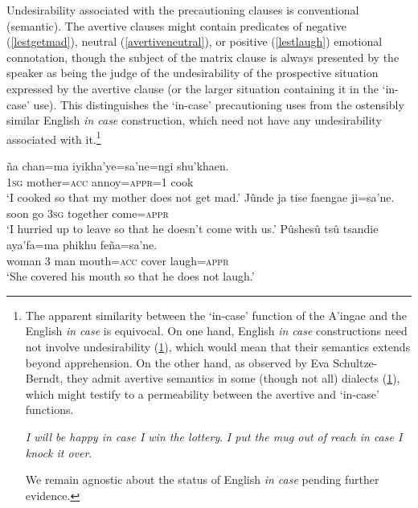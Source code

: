 \documentclass[output=paper,colorlinks,citecolor=brown]{langscibook}
\begin{document}
Undesirability associated with the precautioning  clauses is conventional (semantic). The avertive  clauses might contain predicates of negative (\ref{lestgetmad}), neutral (\ref{avertiveneutral}), or positive (\ref{lestlaugh}) emotional connotation, though the subject of the matrix clause is always presented by the speaker as being the judge of the undesirability of the prospective situation expressed by the avertive  clause (or the larger situation containing it in the `in-case' use). This distinguishes the `in-case' precautioning uses from the ostensibly similar English \textit{in case} construction, which need not have any {undesirability} associated with it.\footnote{The apparent similarity between the `in-case' function of the A'ingae  and the English \textit{in case} is equivocal. On one hand, English \textit{in case} constructions need not involve undesirability (\ref{incase}), which would mean that their semantics extends beyond apprehension. On the other hand, as observed by Eva Schultze-Berndt, they admit avertive semantics in some (though not all) dialects (\ref{cup}), which might testify to a permeability between the avertive and `in-case' functions.
    \begin{exe}
        \ex \label{incase} \textit{I will be happy in case I win the lottery}.
        \ex \label{cup} \textit{I put the mug out of reach in case I knock it over}.
    \end{exe}
{We remain agnostic about the status of English \textit{in case} pending further evidence.}}
\begin{exe}
    \ex \label{lestgetmad} %
    \gll {\ob}ña    chan=ma    iyikha'ye=sa'ne{\cb}=ngi shu'khaen. \\
         \textsc{1sg} mother=\textsc{acc} annoy=\textsc{appr=1} cook \\
    \glt `I cooked so that my mother does not get mad.'
    \ex \label{avertiveneutral}
    \gll Jûnde ja {\ob}tise faengae ji=sa'ne.{\cb} \\
         soon  go \textsc{3sg} together come=\textsc{appr} \\
    \glt `I hurried up to leave so that he doesn't come with us.'
    \ex \label{lestlaugh} 
    \gll Pûshesû tsû tsandie aya'fa=ma     phikhu {\ob}feña=sa'ne.{\cb} \\
         woman       \textsc{3}     man     mouth=\textsc{acc} cover  laugh=\textsc{appr} \\
    \glt `She covered his mouth so that he does not laugh.'
\end{exe}
\end{document}
